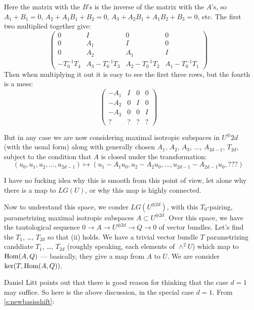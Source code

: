 {  Here the matrix with the $B$'s is the inverse of the matrix with the $A$'s, so $A_1+B_1=0$, $A_2+A_1 B_1 + B_2 =0$, $A_3 + A_2 B_1 + A_1 B_2  + B_3=0$, etc.
  The first two multiplied together give:
  $$
  \begin{pmatrix}
    0 & I & 0 & 0 \\
    0 & A_1 & I & 0 \\
    0 & A_2 & A_1 & I \\
    -T_0^{-1} T_4 & A_3 - T_0^{-1} T_3 & A_2 - T_0^{-1} T_2 & A_1 - T_0^{-1} T_1 
  \end{pmatrix}
  $$
  Then when multiplying it out it is easy to see the first three rows, but the fourth is a mess:
$$
\begin{pmatrix}
  -A_1 & I & 0 & 0 \\
  -A_2 & 0 & I & 0 \\
  - A_3 & 0 & 0 & I \\
  ? & ? & ? & ?
\end{pmatrix}
$$

But in any case we are now considering maximal isotropic subspaces in $U^\oplus{2d}$ (with the usual form) along with generally chosen $A_1$, $A_2$, $A_3$, ..., $A_{2d-1}$, $T_{2d}$, subject to the condition that $A$ is closed under the transformation:
$$
(u_0, u_1, u_2, ..., u_{2d-1}) \mapsto   (u_1 -A_1 u_0, u_2 - A_2 u_0, ..., u_{2d-1} - A_{2d-1} u_0, ???)$$

I have no fucking idea why this is smooth from this point of view, let alone why there is a map to $LG(U)$, or why this
map is highly connected.

 Now to understand this space, we conder $LG(U^{\oplus 2d})$, with this $T_0$-pairing, parametrizing
maximal isotropic subspaces $A \subset U^{\oplus 2d}$.
Over this space, we have the tautological sequence $0 \rightarrow A \rightarrow U^{\oplus 2d} \rightarrow Q \rightarrow 0$
of vector bundles.
Let's find the $T_1$, \dots, $T_{2d}$ so that (ii) holds.    We have a trivial vector bundle $T$
parametrizing canddiate $T_1$, \dots, $T_{2d}$ (roughly speaking, each elements of $\wedge^2 U$)
which map to $\operatorname{Hom}( A,Q)$ --- basically, they give a map from $A$ to $U$.
We are consider $\ker( T, \operatorname{Hom}(A,Q))$.


Daniel Litt points out that there is good reason for thinking that the case $d=1$ may suffice.  So here is the above discussion, in the special case $d=1$.  From \ref{s:newbasisshift}:

}
